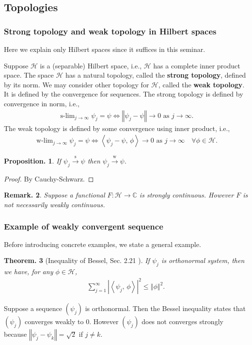 \documentclass[openany, a4paper, oneside]{jsbook}
\DeclareMathOperator*{\slim}{s-lim}
\DeclareMathOperator*{\wlim}{w-lim}
\theoremstyle{break}
\theoremstyle{breakdefn}
\newtheorem{thm}{Theorem.}[section]
\newtheorem{prop}[thm]{Proposition.}
\newtheorem{rem}[thm]{Remark.}
\newcommand{\abs}[1]{\left|#1\right|}
\newcommand{\norm}[1]{\left\Vert#1\right\Vert}
\newcommand{\bkt}[2]{\left\langle#1,\,#2\right\rangle}
\newcommand{\bbC}{\mathbb{C}}
\newcommand{\calH}{\mathcal{H}}
\newcommand{\sto}{\xrightarrow{\text{s}}}
\newcommand{\wto}{\xrightarrow{\text{w}}}
\begin{document}
\subsection{Topologies \label{Lieb-Loss_Analysis_chap11_36}}

\subsubsection{Strong topology and weak topology in Hilbert spaces}


Here we explain only Hilbert spaces since it suffices in this seminar.

Suppose $\calH$ is a (separable) Hilbert space, i.e., $\calH$ has a complete inner product space.
The space $\calH$ has a natural topology, called the \textbf{strong topology}, defined by its norm.
We may consider other topology for $\calH$, called the \textbf{weak topology}.
It is defined by the convergence for sequences.
The strong topology is defined by convergence in norm, i.e.,
\begin{align}
 \slim_{j \to \infty} \psi_j = \psi
 \Longleftrightarrow
 \norm{\psi_j - \psi} \to 0 \text{ as } j \to \infty.
\end{align}
The weak topology is defined by some convergence using inner product, i.e.,
\begin{align}
 \wlim_{j \to \infty} \psi_j = \psi
 \Longleftrightarrow
 \bkt{\psi_j - \psi}{\phi} \to 0 \text{ as } j \to \infty \quad \forall \phi \in \calH.
\end{align}
\begin{prop}
 If $\psi_j \sto \psi$ then $\psi_j \wto \psi$.
\end{prop}
\begin{proof}
By Cauchy-Schwarz.
\end{proof}
\begin{rem}
 Suppose a functional $F \colon \calH \to \bbC$ is strongly continuous.
 However $F$ is not necessarily weakly continuous.
\end{rem}
\subsubsection{Example of weakly convergent sequence}


Before introducing concrete examples, we state a general example.
\begin{thm}[Inequality of Bessel, Sec. 2.21 \cite{LiebLoss1}]
 If $\psi_j$ is orthonormal system, then we have, for any $\phi \in \calH$,
 \begin{align}
  \sum_{j = 1}^{\infty} \abs{\bkt{\psi_j}{\phi}}^2
  \leq
  \norm{\phi}^2.
 \end{align}
\end{thm}
Suppose a sequence $(\psi_j)$ is orthonormal.
Then the Bessel inequality states that $(\psi_j)$ converges weakly to 0.
However $(\psi_j)$ does not converges strongly because $\norm{\psi_j - \psi_k} = \sqrt{2}$ if $j \neq k$.
\end{document}
